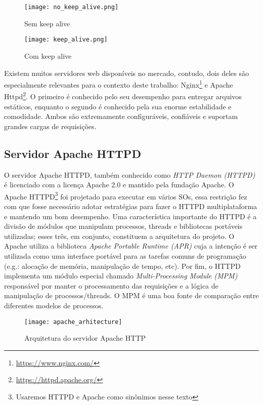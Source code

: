 \begin{figure}[!h]
  \centering
  \texttt{[image: no\_keep\_alive.png]}
  \caption{Sem keep alive}
  \label{fig:no_keep_alive}
\end{figure}

\begin{figure}[!h]
  \texttt{[image: keep\_alive.png]}
  \caption{Com keep alive}
  \label{fig:keep_alive}
\end{figure}

Existem muitos servidores web disponíveis no mercado, contudo, dois deles são
especialmente relevantes para o contexto deste trabalho:
Nginx\footnote{\url{https://www.nginx.com/}} e Apache
Httpd\footnote{\url{https://httpd.apache.org/}}.  O primeiro é conhecido pelo
seu desempenho para entregar arquivos estáticos, enquanto o segundo é conhecido
pela sua enorme estabilidade e comodidade. Ambos são extremamente
configuráveis, confiáveis e suportam grandes cargas de requisições.

\subsection{Servidor Apache HTTPD}
\label{sec:architecture}

O servidor Apache HTTPD, também conhecido como \textit{HTTP Daemon (HTTPD)} é
licenciado com a licença Apache 2.0 e mantido pela fundação Apache.  O Apache
HTTPD\footnote{Usaremos HTTPD e Apache como sinônimos nesse texto} foi
projetado para executar em vários SOs, essa restrição fez com que fosse
necessário adotar estratégias para fazer o HTTPD multiplataforma e mantendo um
bom desempenho.  Uma característica importante do HTTPD é a divisão de módulos
que manipulam processos, threads e bibliotecas portáveis utilizadas; esses
três, em conjunto, constituem a arquitetura do projeto. O Apache utiliza
a biblioteca \textit{Apache Portable Runtime (APR)} cuja a intenção é ser
utilizada como uma interface portável para as tarefas comuns de programação
(e.g.: alocação de memória, manipulação de tempo, etc). Por fim, o HTTPD
implementa um módulo especial chamado \textit{Multi-Processing Module (MPM)}
responsável por manter o processamento das requisições e a lógica de
manipulação de processos/threads. O MPM é uma boa fonte de comparação entre
diferentes modelos de processos.

\begin{figure}[!h]
  \centering
  \texttt{[image: apache\_arhitecture]} 
  \caption{Arquitetura do servidor Apache HTTP \citep{apache_module_book}}
  \label{fig:apache_architecture} 
\end{figure}

